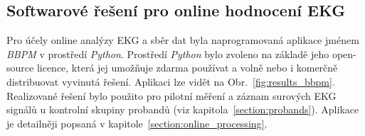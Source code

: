 



\subsection{Softwarové řešení pro online hodnocení EKG}
\label{sections:result_offline}
Pro účely online analýzy EKG a sběr dat byla naprogramovaná aplikace jménem
\textit{BBPM} v prostředí \textit{Python}. Prostředí \textit{Python} bylo
zvoleno na základě jeho open-source licence, která jej umožňuje zdarma používat
a volně nebo i komerčně distribuovat vyvinutá řešení. Aplikaci lze vidět na
Obr.~\ref{fig:results_bbpm}. Realizované řešení bylo použito pro pilotní měření
a záznam surových EKG signálů u kontrolní skupiny probandů (viz
kapitola~\ref{section:probands}). Aplikace je detailněji popsaná v
kapitole~\ref{section:online_processing}.

